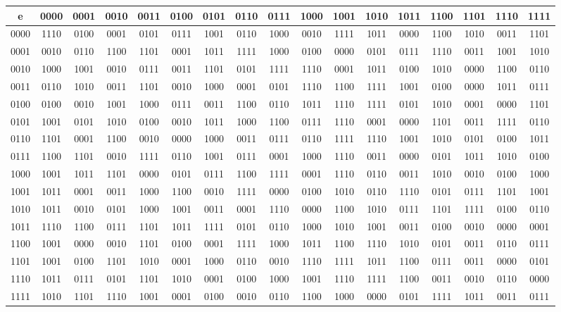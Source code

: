 \documentclass[10pt, a4paper]{exam}
\begin{document}
\begin{questions}
  \begin{tabular}{c|c|c|c|c|c|c|c|c|c|c|c|c|c|c|c|c}
    e    & 0000 & 0001 & 0010 & 0011 & 0100 & 0101 & 0110 & 0111 & 1000 & 1001 & 1010 & 1011 & 1100 & 1101 & 1110 & 1111 \\\hline
    0000 & 1110 & 0100 & 0001 & 0101 & 0111 & 1001 & 0110 & 1000 & 0010 & 1111 & 1011 & 0000 & 1100 & 1010 & 0011 & 1101 \\
    0001 & 0010 & 0110 & 1100 & 1101 & 0001 & 1011 & 1111 & 1000 & 0100 & 0000 & 0101 & 0111 & 1110 & 0011 & 1001 & 1010 \\
    0010 & 1000 & 1001 & 0010 & 0111 & 0011 & 1101 & 0101 & 1111 & 1110 & 0001 & 1011 & 0100 & 1010 & 0000 & 1100 & 0110 \\
    0011 & 0110 & 1010 & 0011 & 1101 & 0010 & 1000 & 0001 & 0101 & 1110 & 1100 & 1111 & 1001 & 0100 & 0000 & 1011 & 0111 \\
    0100 & 0100 & 0010 & 1001 & 1000 & 0111 & 0011 & 1100 & 0110 & 1011 & 1110 & 1111 & 0101 & 1010 & 0001 & 0000 & 1101 \\
    0101 & 1001 & 0101 & 1010 & 0100 & 0010 & 1011 & 1000 & 1100 & 0111 & 1110 & 0001 & 0000 & 1101 & 0011 & 1111 & 0110 \\
    0110 & 1101 & 0001 & 1100 & 0010 & 0000 & 1000 & 0011 & 0111 & 0110 & 1111 & 1110 & 1001 & 1010 & 0101 & 0100 & 1011 \\
    0111 & 1100 & 1101 & 0010 & 1111 & 0110 & 1001 & 0111 & 0001 & 1000 & 1110 & 0011 & 0000 & 0101 & 1011 & 1010 & 0100 \\
    1000 & 1001 & 1011 & 1101 & 0000 & 0101 & 0111 & 1100 & 1111 & 0001 & 1110 & 0110 & 0011 & 1010 & 0010 & 0100 & 1000 \\
    1001 & 1011 & 0001 & 0011 & 1000 & 1100 & 0010 & 1111 & 0000 & 0100 & 1010 & 0110 & 1110 & 0101 & 0111 & 1101 & 1001 \\
    1010 & 1011 & 0010 & 0101 & 1000 & 1001 & 0011 & 0001 & 1110 & 0000 & 1100 & 1010 & 0111 & 1101 & 1111 & 0100 & 0110 \\
    1011 & 1110 & 1100 & 0111 & 1101 & 1011 & 1111 & 0101 & 0110 & 1000 & 1010 & 1001 & 0011 & 0100 & 0010 & 0000 & 0001 \\
    1100 & 1001 & 0000 & 0010 & 1101 & 0100 & 0001 & 1111 & 1000 & 1011 & 1100 & 1110 & 1010 & 0101 & 0011 & 0110 & 0111 \\
    1101 & 1001 & 0100 & 1101 & 1010 & 0001 & 1000 & 0110 & 0010 & 1110 & 1111 & 1011 & 1100 & 0111 & 0011 & 0000 & 0101 \\
    1110 & 1011 & 0111 & 0101 & 1101 & 1010 & 0001 & 0100 & 1000 & 1001 & 1110 & 1111 & 1100 & 0011 & 0010 & 0110 & 0000 \\
    1111 & 1010 & 1101 & 1110 & 1001 & 0001 & 0100 & 0010 & 0110 & 1100 & 1000 & 0000 & 0101 & 1111 & 1011 & 0011 & 0111
  \end{tabular}


\end{questions}
\end{document}

